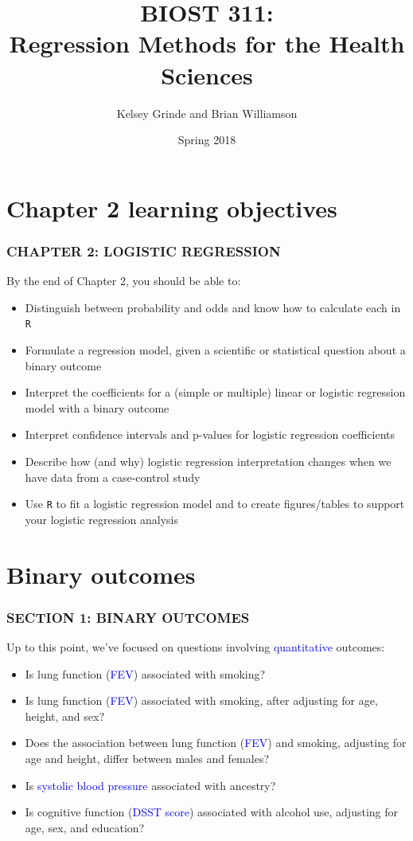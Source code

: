 \documentclass[12pt, 
hyperref={colorlinks=true, linkcolor=blue, urlcolor=cyan}]{beamer}
\title{BIOST 311: \\ Regression Methods for the Health Sciences}
\author{Kelsey Grinde and Brian Williamson}
\institute{UW Biostatistics}
\date{Spring 2018}
\begin{document}
\begin{frame}
\titlepage\thispagestyle{empty}
\end{frame}

  
\setcounter{framenumber}{\value{chap2}}

\section{Chapter 2 learning objectives}
\begin{frame}
\frametitle{CHAPTER 2: LOGISTIC REGRESSION}

By the end of Chapter 2, you should be able to:
\begin{itemize}
\item Distinguish between probability and odds and know how to calculate each in \texttt{R}
\item Formulate a regression model, given a scientific or statistical question about a binary outcome
\item Interpret the coefficients for a (simple or multiple) linear or logistic regression model with a binary outcome
\item Interpret confidence intervals and p-values for logistic regression coefficients
\item Describe how (and why) logistic regression interpretation changes when we have data from a case-control study
\item Use \texttt{R} to fit a logistic regression model  and to create figures/tables to support your logistic regression analysis
\end{itemize}
\end{frame}

\section{Binary outcomes}
\begin{frame}
\frametitle{SECTION 1: BINARY OUTCOMES}
Up to this point, we've focused on questions involving \textcolor{blue}{quantitative} outcomes:

\begin{itemize}
\item Is lung function (\textcolor{blue}{FEV}) associated with smoking?
\item Is lung function (\textcolor{blue}{FEV}) associated with smoking, after adjusting for age, height, and sex?
\item Does the association between lung function (\textcolor{blue}{FEV}) and smoking, adjusting for age and height, differ between males and females?
\item Is \textcolor{blue}{systolic blood pressure} associated with ancestry?
\item Is cognitive function (\textcolor{blue}{DSST score}) associated with alcohol use, adjusting for age, sex, and education?
\end{itemize}
\end{frame}
\end{document}
